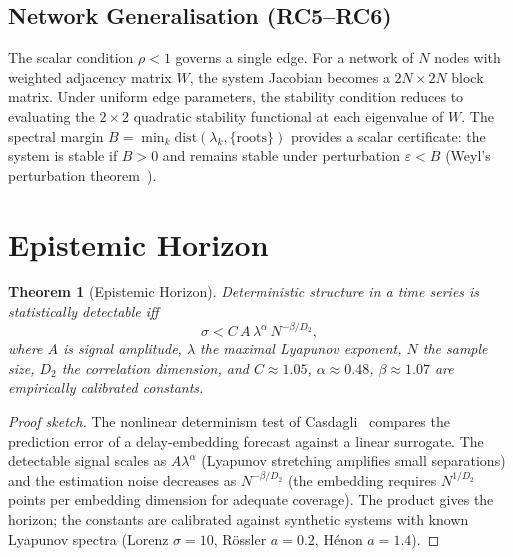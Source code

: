 \documentclass[10pt,twocolumn]{article}
\newtheorem{theorem}{Theorem}[section]
\theoremstyle{definition}
\theoremstyle{remark}
\begin{document}
\subsection{Network Generalisation (RC5--RC6)}

The scalar condition $\rho < 1$ governs a single edge.  For a network of $N$ nodes with weighted adjacency matrix $W$, the system Jacobian becomes a $2N \times 2N$ block matrix.  Under uniform edge parameters, the stability condition reduces to evaluating the $2 \times 2$ quadratic stability functional at each eigenvalue of $W$.  The spectral margin $B = \min_k \mathrm{dist}(\lambda_k, \{\text{roots}\})$ provides a scalar certificate: the system is stable if $B > 0$ and remains stable under perturbation $\varepsilon < B$ (Weyl's perturbation theorem~\cite{Weyl}).

\section{Epistemic Horizon}\label{sec:rc8}

\begin{theorem}[Epistemic Horizon]\label{thm:rc8}
Deterministic structure in a time series is statistically detectable iff
\begin{equation}\label{eq:rc8}
\sigma < C\, A\, \lambda^{\alpha}\, N^{-\beta/D_2},
\end{equation}
where $A$ is signal amplitude, $\lambda$ the maximal Lyapunov exponent, $N$ the sample size, $D_2$ the correlation dimension, and $C \approx 1.05$, $\alpha \approx 0.48$, $\beta \approx 1.07$ are empirically calibrated constants.
\end{theorem}

\begin{proof}[Proof sketch]
The nonlinear determinism test of Casdagli~\cite{Casdagli} compares the prediction error of a delay-embedding forecast against a linear surrogate.  The detectable signal scales as $A \lambda^\alpha$ (Lyapunov stretching amplifies small separations) and the estimation noise decreases as $N^{-\beta/D_2}$ (the embedding requires $N^{1/D_2}$ points per embedding dimension for adequate coverage).  The product gives the horizon; the constants are calibrated against synthetic systems with known Lyapunov spectra (Lorenz $\sigma=10$, R\"ossler $a=0.2$, H\'enon $a=1.4$).
\end{proof}
\end{document}
